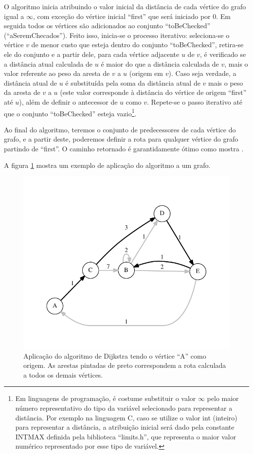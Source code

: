 O algoritmo inicia atribuindo o valor inicial da distância de cada vértice do grafo igual a $\infty$, com exceção do vértice inicial ``first'' que será iniciado por 0. Em seguida todos os vértices são adicionados ao conjunto ``toBeChecked'' (``aSeremChecados''). Feito isso, inicia-se o processo iterativo: seleciona-se o vértice $v$ de menor custo que esteja dentro do conjunto ``toBeChecked'', retira-se ele do conjunto e a partir dele, para cada vértice adjacente $u$ de $v$, é verificado se a distância atual calculada de $u$ é maior do que a distância calculada de $v$, mais o valor referente ao peso da aresta de $v$ a $u$ (origem em $v$). Caso seja verdade, a distância atual de $u$ é substituída pela soma da distância atual de $v$ mais o peso da aresta de $v$ a $u$ (este valor corresponde à distância do vértice de origem ``first'' até $u$), além de definir o antecessor de $u$ como $v$. Repete-se o passo iterativo até que o conjunto ``toBeChecked'' esteja vazio\footnote{Em linguagens de programação, é costume substituir o valor $\infty$ pelo maior número representativo do tipo da variável selecionado para representar a distância. Por exemplo na linguagem C, caso se utilize o valor int (inteiro) para representar a distância, a atribuição inicial será dado pela constante INT\underline{\space}MAX  definida pela biblioteca ``limits.h'', que representa o maior valor numérico representado por esse tipo de variável.}.

Ao final do algoritmo, teremos o conjunto de predecessores de cada vértice do grafo, e a partir deste, poderemos definir a rota para qualquer vértice do grafo partindo de ``first''. O caminho retornado é garantidamente ótimo como mostra .

A figura \ref{fig-dijkstra-algoritmo-grafo} mostra um exemplo de aplicação do algoritmo a um grafo.

\begin{figure}[H]
\centering
\includegraphics[width=1.\textwidth]{figuras/grafo-dijkstra} 
\caption{Aplicação do algoritmo de Dijkstra tendo o vértice ``A'' como origem. As arestas pintadas de preto correspondem a rota calculada a todos os demais vértices.}
\label{fig-dijkstra-algoritmo-grafo}
\end{figure}

